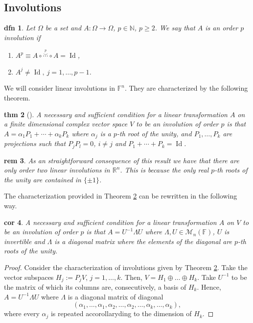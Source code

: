 \documentclass[a4paper,12pt,onecolumn]{article}
\theoremstyle{ptheorem}
\newtheorem{thm}{thm}[section]
\newtheorem{cor}[thm]{cor}
\theoremstyle{hdef}
\newtheorem{dfn}[thm]{dfn}
\newtheorem{rem}[thm]{rem}
\theoremstyle{premark}
\numberwithin{equation}{section}
\numberwithin{figure}{section}
\DeclareMathOperator{\Id}{Id}
\newcommand{\cM}{{\mathcal M}}
\newcommand{\bF}{{\mathbb F}}
\newcommand{\bN}{{\mathbb N}}
\newcommand{\bR}{{\mathbb R}}
\renewcommand{\a}{\alpha}
\newcommand{\<}{\langle}
\renewcommand{\>}{\rangle}
\renewcommand{\<}{\left<}
\renewcommand{\>}{\right>}
\renewcommand{\(}{\left(}
\renewcommand{\)}{\right)}
\begin{document}
\subsection{Involutions}
\begin{dfn} Let $\Omega$ be a set and $A:\Omega\to \Omega$, $p\in\bN$, $p\ge2$. We say that $A$  is an \emph{order} $p$ \emph{involution}  if
\begin{enumerate}
\item $A^p\equiv A\circ\stackrel{\stackrel{p}{\smile}}{\cdots}\circ A=\Id$,
\item $A^j\ne\Id,\  j=1,\dots,p-1$.
\end{enumerate}
\end{dfn}
We will consider linear involutions in $\bF^n$. They are characterized by the following theorem.
\begin{thm}[]\label{theoremc}A necessary and sufficient condition for a linear transformation $A$ on a finite dimensional complex vector space $V$ to be an involution of order $p$ is that $A=\a_1P_1+\cdots+\a_kP_k$ where $\a_j$ is a $p$-th root of the unity, and $P_1,\dots,P_k$ are projections such that $P_jP_l=0$, $i\ne j$ and $P_1+\cdots + P_k=\Id$.
\end{thm}
\begin{rem} As an straightforward consequence of this result we have that there are only order two linear involutions in $\bR^n$. This is because the only real $p$-th roots of the unity are contained in $\{\pm 1\}$.
\end{rem}
The characterization provided in Theorem  \ref{theoremc} can be rewritten in the following way.
\begin{cor}A necessary and sufficient condition for a linear transformation $A$ on $V$ to be an involution of order $p$ is that $A=U^{-1}\Lambda U$ where $\Lambda,U\in\cM_n(\bF)$, $U$ is invertible and $\Lambda$ is a diagonal matrix where the elements of the diagonal are $p$-th roots of the unity.
\end{cor}
\begin{proof} Consider the characterization of involutions given by Theorem \ref{theoremc}. Take the vector subspaces $H_j:=P_jV$, $j=1,\dots,k$. Then, $V=H_1\oplus\dots\oplus H_k$. Take $U^{-1}$ to be the matrix of which its columns are, consecutively, a basis of $H_k$. Hence, $A=U^{-1}\Lambda U$ where $\Lambda$ is a diagonal matrix of diagonal \[(\a_1,\dots,\a_1,\a_2,\dots,\a_2,\dots,\a_k,\dots,\a_k),\] where every $\a_j$ is repeated accorollaryding to the dimension of $H_k$.
\end{proof}
\end{document}
